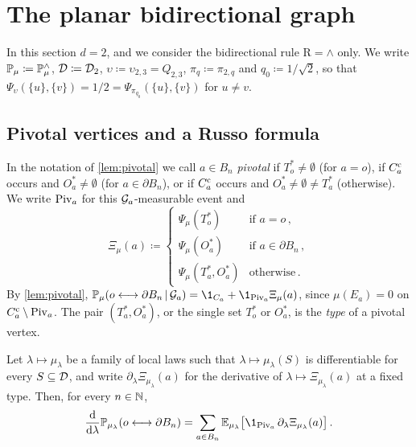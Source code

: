 \documentclass[11pt,letterpaper]{article}
\begin{document}
\section{The planar bidirectional graph}\label{sec:planar}

In this section $d=2$, and we consider the bidirectional rule $\mathrm R=\wedge$ only. We write $\P_\mu\coloneqq\P^{\wedge}_\mu$, $\cD\coloneqq\cD_2$, $\upsilon\coloneqq\upsilon_{2,3}=Q_{2,3}$, $\pi_q\coloneqq\pi_{2,q}$ and $q_0\coloneqq1/\sqrt2$, so that $\Psi_\upsilon(\{u\},\{v\})=1/2=\Psi_{\pi_{q_0}}(\{u\},\{v\})$ for $u\neq v$.

\subsection{Pivotal vertices and a Russo formula}

In the notation of \cref{lem:pivotal} we call $a\in B_n$ \emph{pivotal} if $T_o^*\neq\emptyset$ (for $a=o$), if $C_a^\c$ occurs and $O_a^*\neq\emptyset$ (for $a\in\partial B_n$), or if $C_a^\c$ occurs and $O_a^*\neq\emptyset\neq T_a^*$ (otherwise). We write $\Piv_a$ for this $\cG_a$-measurable event and
\begin{equation*}
\Xi_\mu(a)\coloneqq\begin{cases}\Psi_\mu(T_o^*)&\text{if }a=o\,,\\\Psi_\mu(O_a^*)&\text{if }a\in\partial B_n\,,\\\Psi_\mu(T_a^*,O_a^*)&\text{otherwise}\,.\end{cases}
\end{equation*}
By \cref{lem:pivotal}, $\P_\mu(o\lra\partial B_n\,\lvert\,\cG_a)=\1_{C_a}+\1_{\Piv_a}\Xi_\mu(a)$, since $\mu(E_a)=0$ on $C_a^\c\setminus\Piv_a$. The pair $(T_a^*,O_a^*)$, or the single set $T_o^*$ or $O_a^*$, is the \emph{type} of a pivotal vertex.

\begin{lemma}\label{lem:russo}
Let $\lambda\mapsto\mu_\lambda$ be a family of local laws such that $\lambda\mapsto\mu_\lambda(S)$ is differentiable for every $S\subseteq\cD$, and write $\partial_\lambda\Xi_{\mu_\lambda}(a)$ for the derivative of $\lambda\mapsto\Xi_{\mu_\lambda}(a)$ at a fixed type. Then, for every $n\in\N$,
\begin{equation*}
\frac{\d}{\d \lambda}\P_{\mu_\lambda}(o\lra\partial B_n)=\sum_{a\in B_n}\E_{\mu_\lambda}\big[\1_{\Piv_a}\,\partial_\lambda\Xi_{\mu_\lambda}(a)\big]\,.
\end{equation*}
\end{lemma}
\end{document}
